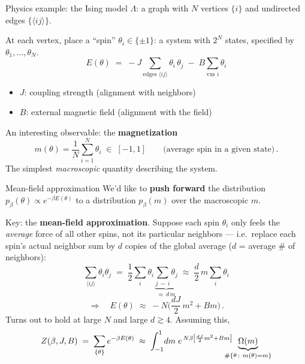 \documentclass[11pt]{beamer}
\newcommand{\hl}[1]{{\color{blue!60!black}\textbf{#1}}}
\begin{document}
\begin{frame}{Physics example: the Ising model}
  $\Lambda$: a graph with $N$ vertices $\{i\}$ and undirected edges
  $\{\langle ij\rangle\}$.
  \vspace{1mm}

  At each vertex, place a ``spin'' $\theta_i \in \{\pm 1\}$: a system with
  $2^N$ states, specified by $\theta_1, \dots, \theta_N$.
  \[
    E(\theta) \;=\; -J\!\!\sum_{\text{edges }\langle ij\rangle}\!\!
    \theta_i\,\theta_j \;-\; B \sum_{\text{vxs } i} \theta_i
  \]
  \begin{itemize}
    \item $J$: coupling strength (alignment with neighbors)
    \item $B$: external magnetic field (alignment with the field)
  \end{itemize}
  \vspace{2mm}

  An interesting observable: the \hl{magnetization}
  \vspace{-.2cm}
  \[
    m(\theta) = \frac1N \sum_{i=1}^N \theta_i \;\in\; [-1, 1]
    \qquad \text{(average spin in a given state)}\,.
  \]
  The simplest \emph{macroscopic} quantity describing the system.
  \vspace{1mm}
\end{frame}

\begin{frame}{Mean-field approximation}
  We'd like to \hl{push forward} the distribution
  $p_\beta(\theta) \propto e^{-\beta E(\theta)}$
  to a distribution $p_\beta(m)$ over the macroscopic $m$.
  \vspace{2mm}

  Key: the \hl{mean-field approximation}. Suppose each spin $\theta_i$
  only feels the \emph{average} force of all other spins, not its
  particular neighbors --- i.e.\ replace each spin's actual neighbor sum
  by $d$ copies of the global average ($d$ = average \# of neighbors):
  \[
    \sum_{\langle ij\rangle} \theta_i\theta_j
    \;=\; \frac12 \sum_i \theta_i
    \underbrace{\sum_{j\,\sim\, i}\theta_j}_{
      \textstyle \approx\ d\, m}
    \;\approx\; \frac{d}{2}\, m \sum_i \theta_i
  \]
  \[
    \Rightarrow\quad E(\theta) \;\approx\; -N\Big(\frac{dJ}{2}\,m^2 + Bm\Big)\,.
  \]
  Turns out to hold at large $N$ and large $d\gtrsim4$.
  Assuming this,
  \[
    Z(\beta, J, B) \;=\; \sum_{\{\theta\}} e^{-\beta E(\theta)}
    \;\approx\; \int_{-1}^{1}\! dm\;
    e^{\,N\beta\left[\frac{dJ}{2}m^2 + Bm\right]} \hspace{-.4cm}
    \underbrace{\Omega(m)}_{\#\{\theta\,:\ m(\theta) = m\}}
  \]
\end{frame}
\end{document}
